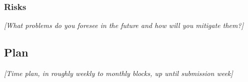 \documentclass[11pt]{article}
\begin{document}
\subsubsection{Risks}\label{risks}

\emph{{[}What problems do you foresee in the future and how will you
mitigate them?{]}}

\subsection{Plan}\label{plan}

\emph{{[}Time plan, in roughly weekly to monthly blocks, up until
submission week{]}}

\medskip

    
    
\end{document}
